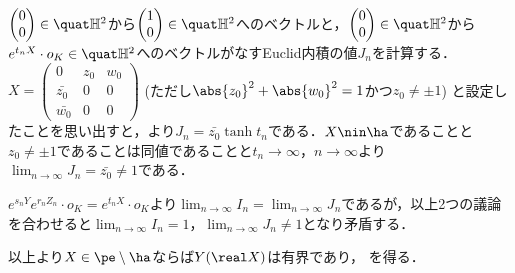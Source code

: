 \begin{npfwn}
  $
  \begin{pmatrix}
    0 \\ 0 
  \end{pmatrix}
  \in \quat\mathbb{H}^2 $から$
  \begin{pmatrix}
    1 \\ 0
  \end{pmatrix}
  \in \quat\mathbb{H}^2 $へのベクトルと，$
  \begin{pmatrix}
    0 \\ 0 
  \end{pmatrix}
  \in \quat\mathbb{H}^2 $から$e^{t_nX}\cdot o_K \in \quat \mathbb{H}^2 $へのベクトルがなすEuclid内積の値$J_n$を計算する．$X =   \begin{pmatrix}
    0 & z_0 & w_0 \\
    \bar{z_0} & 0 & 0 \\
    \bar{w_0} & 0 & 0 
  \end{pmatrix}$ (ただし$\abs{z_0}^2 + \abs{w_0}^2 = 1 $かつ$z_0\neq \pm 1 $) と設定したことを思い出すと，より$J_n = \bar{z_0}\tanh t_n $である．$X\nin \ha $であることと$z_0\neq \pm 1$であることは同値であることと$t_n\to \infty$，$n\to \infty$より$\lim_{n\to \infty}J_n = \bar{z_0}\neq 1 $である．%

  $e^{s_n Y}e^{r_n Z_n}\cdot o_K = e^{t_n X}\cdot o_K$より$ \lim_{n\to \infty} I_n = \lim_{n\to \infty}J_n  $であるが，以上2つの議論を合わせると$\lim_{n\to \infty} I_n= 1$，$\lim_{n\to \infty}J_n \neq 1 $となり矛盾する．
  

  以上より$X\in \pe\setminus\ha$ならば$Y(\real X) $は有界であり， を得る．  
\end{npfwn}


